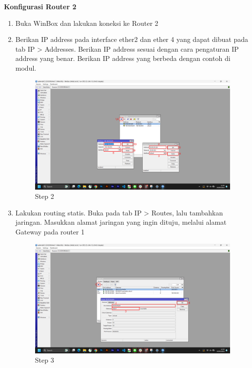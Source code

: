 \begin{center}
	\textbf{Konfigurasi Router 2}
	\begin{enumerate}
		\item Buka WinBox dan lakukan koneksi ke Router 2
		\item Berikan IP address pada interface ether2 dan ether 4 yang dapat dibuat pada tab IP > Addresses. Berikan IP address sesuai dengan cara pengaturan IP address yang benar. Berikan IP address yang berbeda dengan contoh di modul.
		\begin{figure}[H]
			\centering
			\includegraphics[width=0.9\linewidth]{P2/img/per1/pc2/Step 2.png}
			\caption{Step 2}
			\label{fig:Step 2(Per.1 PC2)}
		\end{figure}
		\item Lakukan routing statis. Buka pada tab IP > Routes, lalu tambahkan jaringan. Masukkan alamat jaringan yang ingin dituju, melalui alamat Gateway pada router 1
		\begin{figure}[H]
			\centering
			\includegraphics[width=0.9\linewidth]{P2/img/per1/pc2/Step 3.png}
			\caption{Step 3}
			\label{fig:Step 3(Per.1 PC2)}
		\end{figure}
	\end{enumerate}


\end{center}
